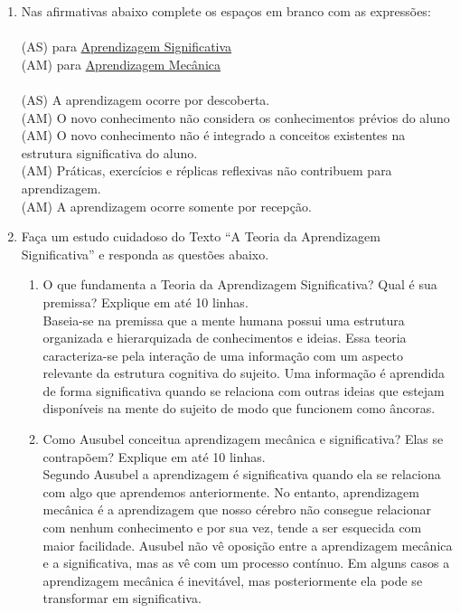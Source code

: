 \documentclass[a4paper, 12pt]{article}
\begin{document}
\begin{enumerate}
\item Nas afirmativas abaixo complete os espaços em branco com as expressões: \\\\
  (AS) para \underline{Aprendizagem Significativa}\\
  (AM) para \underline{Aprendizagem Mecânica}\\\\
  (AS) A aprendizagem ocorre por descoberta.\\
  (AM) O novo conhecimento não considera os conhecimentos prévios do aluno\\
  (AM) O novo conhecimento não é integrado a conceitos existentes na estrutura significativa do aluno.\\
  (AM) Práticas, exercícios e réplicas reflexivas não contribuem para aprendizagem.\\
  (AM) A aprendizagem ocorre somente por recepção.
\item Faça um estudo cuidadoso do Texto ``A Teoria da Aprendizagem Significativa'' e responda as questões abaixo.
  \begin{enumerate}
  \item O que fundamenta a Teoria da Aprendizagem Significativa? Qual é sua premissa? Explique em até 10 linhas.\\
    Baseia-se na premissa que a mente humana possui uma estrutura organizada e hierarquizada de conhecimentos e ideias. Essa teoria caracteriza-se pela interação de uma informação com um aspecto relevante da estrutura cognitiva do sujeito. Uma informação é aprendida de forma significativa quando se relaciona com outras ideias que estejam disponíveis na mente do sujeito de modo que funcionem como âncoras.
  \item Como Ausubel conceitua aprendizagem mecânica e significativa? Elas se contrapõem? Explique em até 10 linhas.\\
    Segundo Ausubel a aprendizagem é significativa quando ela se relaciona com algo que aprendemos anteriormente. No entanto, aprendizagem mecânica é a aprendizagem que nosso cérebro não consegue relacionar com nenhum conhecimento e por sua vez, tende a ser esquecida com maior facilidade. Ausubel não vê oposição entre a aprendizagem mecânica e a significativa, mas as vê com um processo contínuo. Em alguns casos a aprendizagem mecânica é inevitável, mas posteriormente ela pode se transformar em significativa.
    

\end{enumerate}
\end{enumerate}
\end{document}
